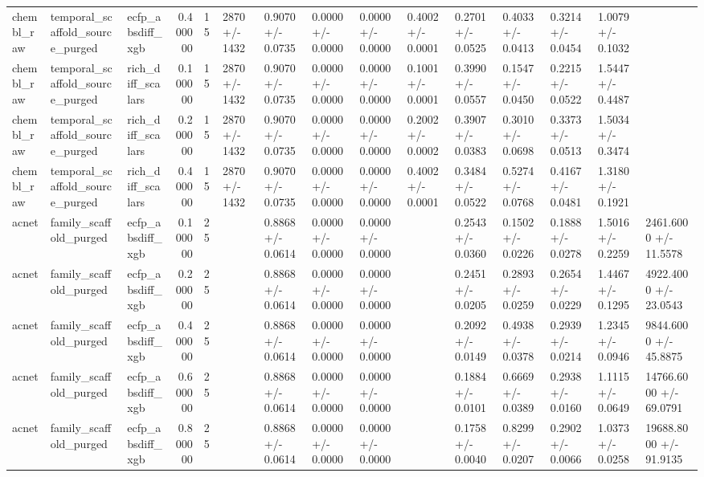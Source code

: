 \begin{longtable}{lllrlllllllllll}
chembl\_raw & temporal\_scaffold\_source\_purged & ecfp\_absdiff\_xgb & 0.400000 & 15 & 2870 +/- 1432 & 0.9070 +/- 0.0735 & 0.0000 +/- 0.0000 & 0.0000 +/- 0.0000 & 0.4002 +/- 0.0001 & 0.2701 +/- 0.0525 & 0.4033 +/- 0.0413 & 0.3214 +/- 0.0454 & 1.0079 +/- 0.1032 &  \\
chembl\_raw & temporal\_scaffold\_source\_purged & rich\_diff\_scalars & 0.100000 & 15 & 2870 +/- 1432 & 0.9070 +/- 0.0735 & 0.0000 +/- 0.0000 & 0.0000 +/- 0.0000 & 0.1001 +/- 0.0001 & 0.3990 +/- 0.0557 & 0.1547 +/- 0.0450 & 0.2215 +/- 0.0522 & 1.5447 +/- 0.4487 &  \\
chembl\_raw & temporal\_scaffold\_source\_purged & rich\_diff\_scalars & 0.200000 & 15 & 2870 +/- 1432 & 0.9070 +/- 0.0735 & 0.0000 +/- 0.0000 & 0.0000 +/- 0.0000 & 0.2002 +/- 0.0002 & 0.3907 +/- 0.0383 & 0.3010 +/- 0.0698 & 0.3373 +/- 0.0513 & 1.5034 +/- 0.3474 &  \\
chembl\_raw & temporal\_scaffold\_source\_purged & rich\_diff\_scalars & 0.400000 & 15 & 2870 +/- 1432 & 0.9070 +/- 0.0735 & 0.0000 +/- 0.0000 & 0.0000 +/- 0.0000 & 0.4002 +/- 0.0001 & 0.3484 +/- 0.0522 & 0.5274 +/- 0.0768 & 0.4167 +/- 0.0481 & 1.3180 +/- 0.1921 &  \\
acnet & family\_scaffold\_purged & ecfp\_absdiff\_xgb & 0.100000 & 25 &  & 0.8868 +/- 0.0614 & 0.0000 +/- 0.0000 & 0.0000 +/- 0.0000 &  & 0.2543 +/- 0.0360 & 0.1502 +/- 0.0226 & 0.1888 +/- 0.0278 & 1.5016 +/- 0.2259 & 2461.6000 +/- 11.5578 \\
acnet & family\_scaffold\_purged & ecfp\_absdiff\_xgb & 0.200000 & 25 &  & 0.8868 +/- 0.0614 & 0.0000 +/- 0.0000 & 0.0000 +/- 0.0000 &  & 0.2451 +/- 0.0205 & 0.2893 +/- 0.0259 & 0.2654 +/- 0.0229 & 1.4467 +/- 0.1295 & 4922.4000 +/- 23.0543 \\
acnet & family\_scaffold\_purged & ecfp\_absdiff\_xgb & 0.400000 & 25 &  & 0.8868 +/- 0.0614 & 0.0000 +/- 0.0000 & 0.0000 +/- 0.0000 &  & 0.2092 +/- 0.0149 & 0.4938 +/- 0.0378 & 0.2939 +/- 0.0214 & 1.2345 +/- 0.0946 & 9844.6000 +/- 45.8875 \\
acnet & family\_scaffold\_purged & ecfp\_absdiff\_xgb & 0.600000 & 25 &  & 0.8868 +/- 0.0614 & 0.0000 +/- 0.0000 & 0.0000 +/- 0.0000 &  & 0.1884 +/- 0.0101 & 0.6669 +/- 0.0389 & 0.2938 +/- 0.0160 & 1.1115 +/- 0.0649 & 14766.6000 +/- 69.0791 \\
acnet & family\_scaffold\_purged & ecfp\_absdiff\_xgb & 0.800000 & 25 &  & 0.8868 +/- 0.0614 & 0.0000 +/- 0.0000 & 0.0000 +/- 0.0000 &  & 0.1758 +/- 0.0040 & 0.8299 +/- 0.0207 & 0.2902 +/- 0.0066 & 1.0373 +/- 0.0258 & 19688.8000 +/- 91.9135 \\

\end{longtable}
